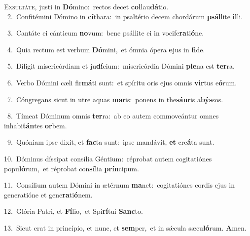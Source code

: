 \lettrine{\initial\textcolor{\initialcolor}{E}}{xsultáte,} justi in \textbf{Dó}\-mino:~\star rectos decet \textbf{col}\-lau\-\textbf{dá}\-tio.\\
{\numbfont\textcolor{\numbcolor}{~2.}}~Confitémini Dómino in \textbf{cí}\-thara:~\star in psaltério decem chordárum \textbf{psál}\-lite \textbf{il}\-li.\par
{\numbfont\textcolor{\numbcolor}{~3.}}~Cantáte ei cánticum \textbf{no}\-vum:~\star bene psállite ei in vocife\-\textbf{ra}\-ti\-\textbf{ó}\-ne.\par
{\numbfont\textcolor{\numbcolor}{~4.}}~Quia rectum est verbum \textbf{Dó}\-mini,~\star et ómnia ópera \textbf{e}\-jus in \textbf{fi}\-de.\par
{\numbfont\textcolor{\numbcolor}{~5.}}~Díligit misericórdiam et ju\-\textbf{dí}\-cium:~\star misericórdia Dómini \textbf{ple}\-na est \textbf{ter}\-ra.\par
{\numbfont\textcolor{\numbcolor}{~6.}}~Verbo Dómini cæli fir\-\textbf{má}\-ti sunt:~\star et spíritu oris ejus omnis \textbf{vir}\-tus e\-\textbf{ó}\-rum.\par
{\numbfont\textcolor{\numbcolor}{~7.}}~Cóngregans sicut in utre aquas \textbf{ma}\-ris:~\star ponens in the\-\textbf{sáu}\-ris a\-\textbf{býs}\-sos.\par
{\numbfont\textcolor{\numbcolor}{~8.}}~Tímeat Dóminum omnis \textbf{ter}\-ra:~\star ab eo autem commoveántur omnes inhabi\-\textbf{tán}\-tes \textbf{or}\-bem.\par
{\numbfont\textcolor{\numbcolor}{~9.}}~Quóniam ipse dixit, et \textbf{fac}\-ta sunt:~\star ipse mandávit, \textbf{et} cre\-\textbf{á}\-ta sunt.\par
{\numbfont\textcolor{\numbcolor}{10.}}~Dóminus díssipat consília Géntium:~\dagger réprobat autem cogitatiónes popu\-\textbf{ló}\-rum,~\star et réprobat con\-\textbf{sí}\-lia \textbf{prín}\-cipum.\par
{\numbfont\textcolor{\numbcolor}{11.}}~Consílium autem Dómini in ætérnum \textbf{ma}\-net:~\star cogitatiónes cordis ejus in generatióne et gene\-\textbf{ra}\-ti\-\textbf{ó}\-nem.\par
{\numbfont\textcolor{\numbcolor}{12.}}~Glória Patri, et \textbf{Fí}\-lio,~\star et Spi\-\textbf{rí}\-tui \textbf{Sanc}\-to.\par
{\numbfont\textcolor{\numbcolor}{13.}}~Sicut erat in princípio, et nunc, et \textbf{sem}\-per,~\star et in sǽcula sæcu\-\textbf{ló}\-rum. \textbf{A}\-men.\par
